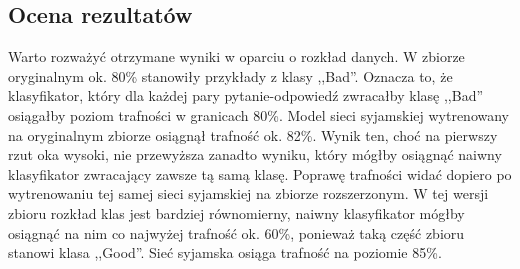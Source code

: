 \subsection{Ocena rezultatów}
Warto rozważyć otrzymane wyniki w oparciu o rozkład danych. W zbiorze oryginalnym ok. 80\% stanowiły przykłady z klasy ,,Bad''. Oznacza to, że klasyfikator, który dla każdej pary pytanie-odpowiedź zwracałby klasę ,,Bad'' osiągałby poziom trafności w granicach 80\%. Model sieci syjamskiej wytrenowany na oryginalnym zbiorze osiągnął trafność ok. 82\%. Wynik ten, choć na pierwszy rzut oka wysoki, nie przewyższa zanadto wyniku, który mógłby osiągnąć naiwny klasyfikator zwracający zawsze tą samą klasę. Poprawę trafności widać dopiero po wytrenowaniu tej samej sieci syjamskiej na zbiorze rozszerzonym. W tej wersji zbioru rozkład klas jest bardziej równomierny, naiwny klasyfikator mógłby osiągnąć na nim co najwyżej trafność ok. 60\%, ponieważ taką część zbioru stanowi klasa ,,Good''. Sieć syjamska osiąga trafność na poziomie 85\%.